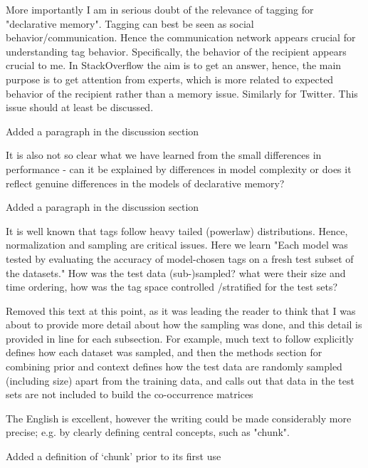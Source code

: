 \documentclass[answers,12pt]{exam}
\begin{document}
\begin{questions}
\question More importantly I am in serious doubt of the relevance of tagging for "declarative memory". Tagging can best be seen as social behavior/communication. Hence the communication network appears crucial for understanding tag behavior. Specifically, the behavior of the recipient appears crucial to me. In StackOverflow the aim is to get an answer, hence, the main purpose is to get attention from experts, which is more related to expected behavior of the recipient rather than a memory issue. Similarly for Twitter. This issue should at least be discussed.

\begin{solution}
Added a paragraph in the discussion section
\end{solution}

\question It is also not so clear what we have learned from the small differences in performance - can it be explained by differences in model complexity or does it reflect genuine differences in the models of declarative memory?

\begin{solution}
Added a paragraph in the discussion section
\end{solution}

\question It is well known that tags follow heavy tailed (powerlaw) distributions. Hence, normalization and sampling are critical issues. Here we learn "Each model was tested by evaluating the accuracy of model-chosen tags on a fresh test subset of the datasets." How was the test data (sub-)sampled? what were their size and time ordering, how was the tag space controlled /stratified for the test sets?

\begin{solution}
Removed this text at this point, as it was leading the reader to think that I was about to provide more detail about how the sampling was done, and this detail is provided in line for each subsection. For example, much text to follow explicitly defines how each dataset was sampled, and then the methods section for combining prior and context defines how the test data are randomly sampled (including size) apart from the training data, and calls out that data in the test sets are not included to build the co-occurrence matrices
\end{solution}

\question The English is excellent, however the writing could be made considerably more precise; e.g. by clearly defining central concepts, such as "chunk".

\begin{solution}
Added a definition of ‘chunk’ prior to its first use
\end{solution}

\end{questions}
\end{document}

